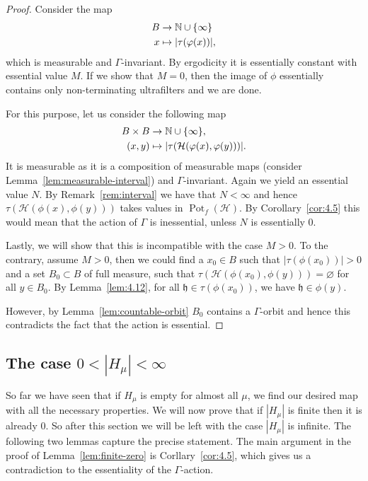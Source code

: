 \begin{proof}
  Consider the map
  \begin{align*}
    B & \to \mathbb{N} \cup \{\infty\}\\
    x & \mapsto |\tau(\varphi(x))|,
  \end{align*}
  which is measurable and \(\Gamma\)-invariant. By ergodicity it is essentially constant with essential value \(M\). If we show that \(M = 0\), then the image of \(\phi\) essentially contains only non-terminating ultrafilters and we are done.

  For this purpose, let us consider the following map
  \begin{align*}
    B \times B & \to \mathbb{N} \cup \{\infty\},\\
    (x,y) & \mapsto |\tau(\mathcal{H}(\varphi(x), \varphi(y)))|.
  \end{align*}
  It is measurable as it is a composition of measurable maps (consider Lemma~\ref{lem:measurable-interval}) and \(\Gamma\)-invariant. Again we yield an essential value \(N\). By Remark~\ref{rem:interval} we have that \(N < \infty\) and hence \(\tau(\mathcal{H}(\phi(x), \phi(y)))\) takes values in \(\operatorname{Pot}_f(\mathcal{H})\). By Corollary~\ref{cor:4.5} this would mean that the action of \(\Gamma\) is inessential, unless \(N\) is essentially 0.

  Lastly, we will show that this is incompatible with the case \(M > 0\). To the contrary, assume \(M > 0\), then we could find a \(x_0 \in B\) such that \(|\tau(\phi(x_0))| > 0\) and a set \(B_0 \subset B\) of full measure, such that \(\tau(\mathcal{H}(\phi(x_0), \phi(y))) = \varnothing\) for all \(y \in B_0\). By Lemma~\ref{lem:4.12}, for all \(\mathfrak{h} \in \tau(\phi(x_0))\), we have \(\mathfrak{h} \in \phi(y)\).

  However, by Lemma~\ref{lem:countable-orbit} \(B_0\) contains a \(\Gamma\)-orbit and hence this contradicts the fact that the action is essential.
\end{proof}

\subsection{The case \(0 < |H_\mu| < \infty\)}
\label{sec:N=finite}

So far we have seen that if \(H_\mu\) is empty for almost all \(\mu\), we find our desired map with all the necessary properties. We will now prove that if \(|H_\mu|\) is finite then it is already 0. So after this section we will be left with the case \(|H_\mu|\) is infinite. The following two lemmas capture the precise statement. The main argument in the proof of Lemma~\ref{lem:finite-zero} is Corllary~\ref{cor:4.5}, which gives us a contradiction to the essentiality of the \(\Gamma\)-action.

